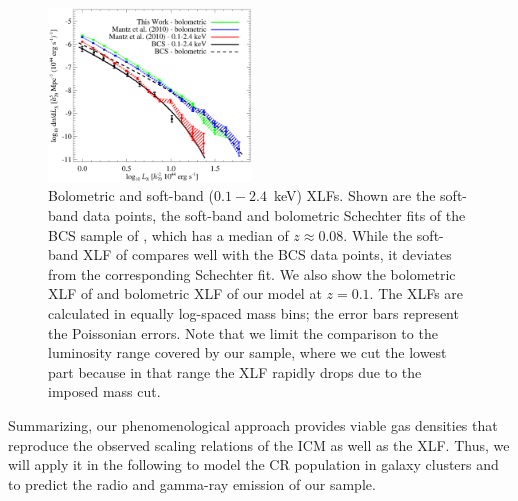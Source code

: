 \documentclass[traditabstract]{aa}
\begin{document}
\begin{figure}[t]
\centering
\includegraphics[width=0.48\textwidth]{figures/xlf.eps}
\caption{Bolometric and soft-band ($0.1-2.4$~keV) XLFs. Shown are the soft-band
  data points, the soft-band and bolometric Schechter fits of the BCS sample of
  \cite{1997ApJ...479L.101E}, which has a median of $z \approx 0.08$.  While the
  soft-band XLF of \cite{2010MNRAS.406.1773M} compares well with the BCS data
  points, it deviates from the corresponding Schechter fit. We also show the
  bolometric XLF of \cite{2010MNRAS.406.1773M} and bolometric XLF of our model at
  $z=0.1$. The XLFs are calculated in equally log-spaced mass bins; the error
  bars represent the Poissonian errors. Note that we limit the comparison to the
  luminosity range covered by our sample, where we cut the lowest part because
  in that range the XLF rapidly drops due to the imposed mass cut.  }
\label{fig:XLF}
\end{figure}

Summarizing, our phenomenological approach provides viable gas densities that
reproduce the observed scaling relations of the ICM as well as the XLF. Thus, we
will apply it in the following to model the CR population in galaxy clusters and
to predict the radio and gamma-ray emission of our sample.


\end{document}
